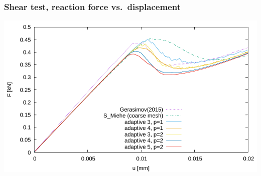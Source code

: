 \documentclass{beamer}
\begin{document}
\begin{frame}
\begin{center}
{    }%
  \end{center}
\end{frame}

\begin{frame}
  \frametitle{Shear test, reaction force vs.~displacement}

  \begin{center}
    \includegraphics[width=\textwidth]{figs/Miehe52-forces}
  \end{center}
\end{frame}
\end{document}
